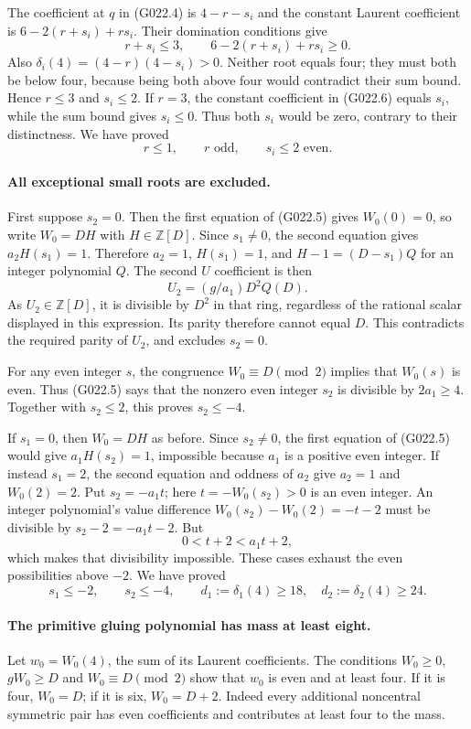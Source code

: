 The coefficient at $q$ in (G022.4) is $4-r-s_i$ and the
constant Laurent coefficient is $6-2(r+s_i)+rs_i$.
Their domination conditions give
\[
 r+s_i\le3,\qquad 6-2(r+s_i)+rs_i\ge0.              \tag{G022.6}
\]
Also $\delta_i(4)=(4-r)(4-s_i)>0$. Neither root equals four;
they must both be below four, because being both above four
would contradict their sum bound. Hence $r\le3$ and $s_i\le2$.
If $r=3$, the constant coefficient in (G022.6) equals $s_i$,
while the sum bound gives $s_i\le0$. Thus both $s_i$ would
be zero, contrary to their distinctness. We have proved
\[
 r\le1,\qquad r\text{ odd},\qquad s_i\le2\text{ even}.
 \tag{G022.7}
\]

\paragraph{All exceptional small roots are excluded.}
First suppose $s_2=0$. Then the first equation of (G022.5)
gives $W_0(0)=0$, so write $W_0=DH$ with $H\in\mathbb Z[D]$.
Since $s_1\ne0$, the second equation gives $a_2H(s_1)=1$.
Therefore $a_2=1$, $H(s_1)=1$, and $H-1=(D-s_1)Q$ for an
integer polynomial $Q$. The second $U$ coefficient is then
\[
 U_2=(g/a_1)D^2Q(D).
\]
As $U_2\in\mathbb Z[D]$, it is divisible by $D^2$ in that
ring, regardless of the rational scalar displayed in this
expression. Its parity therefore cannot equal $D$. This
contradicts the required parity of $U_2$, and excludes $s_2=0$.

For any even integer $s$, the congruence $W_0\equiv D\pmod2$
implies that $W_0(s)$ is even. Thus (G022.5) says that the
nonzero even integer $s_2$ is divisible by $2a_1\ge4$.
Together with $s_2\le2$, this proves $s_2\le-4$.

If $s_1=0$, then $W_0=DH$ as before. Since $s_2\ne0$,
the first equation of (G022.5) would give $a_1H(s_2)=1$,
impossible because $a_1$ is a positive even integer.
If instead $s_1=2$, the second equation and oddness of $a_2$
give $a_2=1$ and $W_0(2)=2$. Put $s_2=-a_1t$; here
$t=-W_0(s_2)>0$ is an even integer. An integer polynomial's
value difference $W_0(s_2)-W_0(2)=-t-2$ must be divisible by
$s_2-2=-a_1t-2$. But
\[
 0<t+2<a_1t+2,
\]
which makes that divisibility impossible. These cases exhaust
the even possibilities above $-2$. We have proved
\[
 s_1\le-2,\qquad s_2\le-4,\qquad
 d_1:=\delta_1(4)\ge18,\quad d_2:=\delta_2(4)\ge24.
 \tag{G022.8}
\]

\paragraph{The primitive gluing polynomial has mass at least eight.}
Let $w_0=W_0(4)$, the sum of its Laurent coefficients. The
conditions $W_0\ge0$, $gW_0\ge D$ and
$W_0\equiv D\pmod2$ show that $w_0$ is even and at least four.
If it is four, $W_0=D$; if it is six, $W_0=D+2$.
Indeed every additional noncentral symmetric pair has even
coefficients and contributes at least four to the mass.

